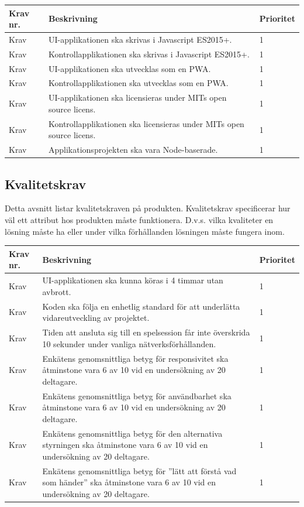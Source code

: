 \documentclass[10pt]{article}
\newcounter{indexcounter}
\newcommand{\Krav}[2]{
	\stepcounter{indexcounter}
	Krav \arabic{indexcounter} & #1 & #2 \\ \hline
}
\begin{document}
	\begin{tabular}{| p{2cm} | p{8cm} | p{2cm}|}
		\hline
		\textbf{Krav nr.} & \textbf{Beskrivning} & \textbf{Prioritet} \\ \hline
		
		\Krav{UI-applikationen ska skrivas i Javascript ES2015+.}{1}
		\Krav{Kontrollapplikationen ska skrivas i Javascript ES2015+.}{1}
		\Krav{UI-applikationen ska utvecklas som en PWA.}{1}
		\Krav{Kontrollapplikationen ska utvecklas som en PWA.}{1}
		\Krav{UI-applikationen ska licensieras under MITs open source licens.}{1}
		\Krav{Kontrollapplikationen ska licensieras under MITs open source licens.}{1}
		\Krav{Applikationsprojekten ska vara Node-baserade.}{1}
		
	\end{tabular}
\pagebreak
	\subsection{Kvalitetskrav}
	Detta avsnitt listar kvalitetskraven på produkten. Kvalitetskrav specificerar hur väl ett attribut hos produkten måste funktionera. D.v.s. vilka kvaliteter en lösning måste ha eller under vilka förhållanden lösningen måste fungera inom.  \\
	
		\begin{tabular}{|p{2cm}|p{8cm}|p{2cm}|}
		\hline
		\textbf{Krav nr.} & \textbf{Beskrivning} & \textbf{Prioritet} \\ \hline
		
		\Krav{UI-applikationen ska kunna köras i 4 timmar utan avbrott.}{1}
		\Krav{Koden ska följa en enhetlig standard\cite{bib-kvalitetsplan} för att underlätta vidareutveckling av projektet.}{1}
		\Krav{Tiden att ansluta sig till en spelsession får inte överskrida 10 sekunder under vanliga nätverksförhållanden.}{1}
        \Krav{Enkätens\cite{bib-kvalitetsplan} genomsnittliga betyg för responsivitet ska åtminstone vara 6 av 10 vid en undersökning av 20 deltagare.}{1}
		\Krav{Enkätens\cite{bib-kvalitetsplan} genomsnittliga betyg för användbarhet ska åtminstone vara 6 av 10 vid en undersökning av 20 deltagare.}{1}
		\Krav{Enkätens\cite{bib-kvalitetsplan} genomsnittliga betyg för den alternativa styrningen ska åtminstone vara 6 av 10 vid en undersökning av 20 deltagare.}{1}
		\Krav{Enkätens\cite{bib-kvalitetsplan} genomsnittliga betyg för ''lätt att förstå vad som händer'' ska åtminstone vara 6 av 10 vid en undersökning av 20 deltagare.}{1}
				
	\end{tabular}
	

\pagebreak

\printbibliography
{}
\end{document}
